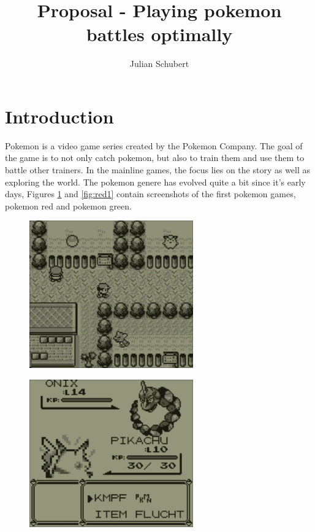 \documentclass{article}
\title{Proposal - Playing pokemon battles optimally}
\author{Julian Schubert}
\begin{document}
\maketitle

\section{Introduction}
Pokemon is a video game series created by the Pokemon Company.
The goal of the game is to not only catch pokemon, but also to train them and use
them to battle other trainers. In the mainline games, the focus lies on the story
as well as exploring the world. The pokemon genere has evolved quite a bit since
it's early days, Figures \ref{fig:red0} and \ref{fig:red1} contain screenshots 
of the first pokemon games, pokemon red and pokemon green.
\begin{figure}[ht]
    \centering
    \begin{minipage}{.5\textwidth}
      \centering
      \includegraphics[width=.9\linewidth]{images/Red-0.jpg}
      \label{fig:red0}
    \end{minipage}%
    \begin{minipage}{.5\textwidth}
      \centering
      \includegraphics[width=.9\linewidth]{images/Red-1.jpg}

\end{minipage}
\end{figure}
\end{document}
